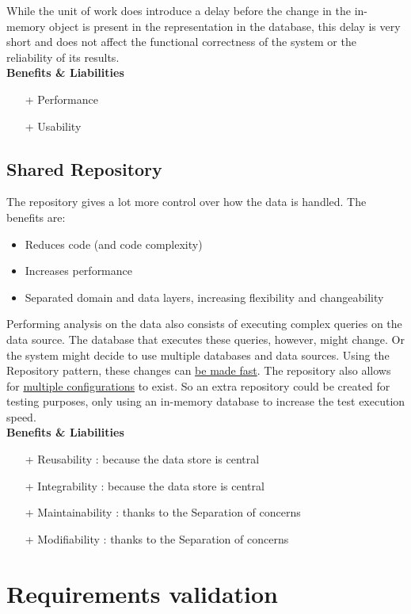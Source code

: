 While the unit of work does introduce a delay before the change in the in-memory object is present in the representation in the database, this delay is very short and does not affect the functional correctness of the system or the reliability of its results.\\
\textbf{Benefits \& Liabilities} ~
\begin{itemize}
\item[+] Performance 
\item[+] Usability
\end{itemize}


\subsection*{Shared Repository} 
The repository gives a lot more control over how the data is handled. The benefits are:
\begin{itemize}
\item Reduces code (and code complexity)
\item Increases performance
\item Separated domain and data layers, increasing flexibility and changeability
\end{itemize}

Performing analysis on the data also consists of executing complex queries on the data source. The database that executes these queries, however, might change. Or the system might decide to use multiple databases and data sources.
Using the Repository pattern, these changes can \underline{be made fast}. The repository also allows for \underline{multiple configurations} to exist. So an extra repository could be created for testing purposes, only using an in-memory database to increase the test execution speed. \\
\textbf{Benefits \& Liabilities} ~
\begin{itemize}
\item[+] Reusability : because the data store is central
\item[+] Integrability : because the data store is central
\item[+] Maintainability : thanks to the Separation of concerns
\item[+] Modifiability : thanks to the Separation of concerns
\end{itemize}

\section{Requirements validation}
\label{sec:req-validation}



